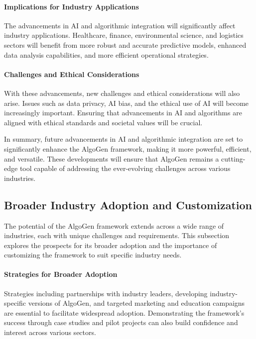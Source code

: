 \documentclass{article}
\begin{document}
\paragraph{Implications for Industry Applications}
The advancements in AI and algorithmic integration will significantly affect industry applications. Healthcare, finance, environmental science, and logistics sectors will benefit from more robust and accurate predictive models, enhanced data analysis capabilities, and more efficient operational strategies.

\paragraph{Challenges and Ethical Considerations}
With these advancements, new challenges and ethical considerations will also arise. Issues such as data privacy, AI bias, and the ethical use of AI will become increasingly important. Ensuring that advancements in AI and algorithms are aligned with ethical standards and societal values will be crucial.

In summary, future advancements in AI and algorithmic integration are set to significantly enhance the AlgoGen framework, making it more powerful, efficient, and versatile. These developments will ensure that AlgoGen remains a cutting-edge tool capable of addressing the ever-evolving challenges across various industries.



\subsection{Broader Industry Adoption and Customization}
The potential of the AlgoGen framework extends across a wide range of industries, each with unique challenges and requirements. This subsection explores the prospects for its broader adoption and the importance of customizing the framework to suit specific industry needs.

\paragraph{Strategies for Broader Adoption}
Strategies including partnerships with industry leaders, developing industry-specific versions of AlgoGen, and targeted marketing and education campaigns are essential to facilitate widespread adoption. Demonstrating the framework's success through case studies and pilot projects can also build confidence and interest across various sectors.
\end{document}
